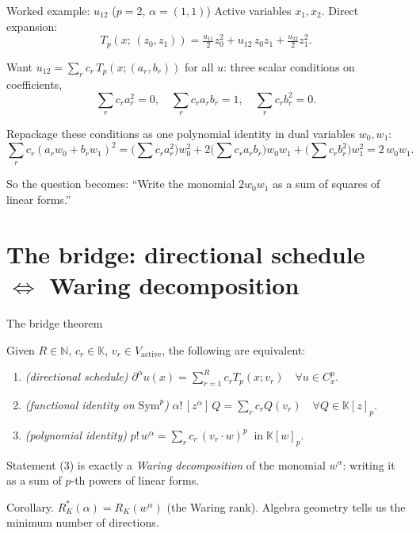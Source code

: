 \documentclass[10pt,aspectratio=169]{beamer}
\newcommand{\K}{\mathbb{K}}
\newcommand{\Sym}{\mathrm{Sym}}
\newcommand{\Tp}{T_p}
\newcommand{\dal}{\partial^\alpha}
\begin{document}
\begin{frame}{Worked example: $u_{12}$ ($p=2$, $\alpha=(1,1)$)}
  Active variables $x_1,x_2$. Direct expansion:
  \[
    \Tp(x;\,(z_0,z_1)) = \tfrac{u_{11}}{2}z_0^2 + u_{12}\,z_0z_1 + \tfrac{u_{22}}{2}z_1^2.
  \]

  \medskip
  Want $u_{12}=\sum_r c_r\,\Tp(x;(a_r,b_r))$ for all $u$:
  three scalar conditions on coefficients,
  \[
    \sum_r c_r a_r^2=0,\quad
    \sum_r c_r a_rb_r=1,\quad
    \sum_r c_r b_r^2=0.
  \]

  \pause
  \medskip
  Repackage these conditions as one polynomial identity in dual variables $w_0,w_1$:
  \[
    \sum_r c_r(a_rw_0+b_rw_1)^2
    =
    \big(\sum c_r a_r^2\big)w_0^2 + 2\big(\sum c_r a_rb_r\big)w_0w_1 + \big(\sum c_r b_r^2\big)w_1^2
    = 2\,w_0w_1.
  \]

  \pause
  \medskip
  \alert{So the question becomes:}
  ``Write the monomial $2w_0w_1$ as a sum of squares of linear forms.''
\end{frame}

\section{The bridge: directional schedule $\Leftrightarrow$ Waring decomposition}

\begin{frame}{The bridge theorem}
  \begin{theorem}[Bridge]
    Given $R\in\mathbb{N}$, $c_r\in\K$, $v_r\in V_{\mathrm{active}}$, the
    following are equivalent:
    \begin{enumerate}
      \item \emph{(directional schedule)}\;
            $\dal u(x) = \sum_{r=1}^R c_r \Tp(x;v_r)\quad\forall u\in C^p_x.$
      \item \emph{(functional identity on $\Sym^p$)}\;
            $\alpha!\,[z^\alpha]\,Q = \sum_r c_r Q(v_r)\quad\forall Q\in\K[z]_p.$
      \item \emph{(polynomial identity)}\;
            $\boxed{p!\,w^\alpha = \sum_r c_r\,(v_r\!\cdot\!w)^p \;\;\text{in}\;\K[w]_p.}$
    \end{enumerate}
  \end{theorem}

  \pause
  \medskip
  Statement (3) is exactly a \emph{Waring decomposition} of the monomial $w^\alpha$:
  writing it as a sum of $p$-th powers of linear forms.

  \medskip
  \alert{Corollary.}
  $\displaystyle R^*_K(\alpha) = R_K(w^\alpha)$ (the Waring rank).
  Algebra geometry tells us the minimum number of directions.
\end{frame}
\end{document}
